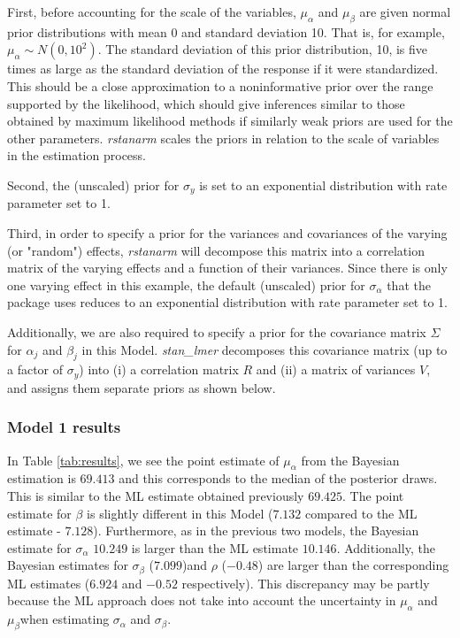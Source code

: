 First, before accounting for the scale of the variables, $\mu_{\alpha}$ and $\mu_{\beta}$ are given normal prior distributions with mean 0 and standard deviation 10.  That is, for example, $\mu_{\alpha} \sim N(0, 10^2)$. The standard deviation of this prior distribution, 10, is five times as large as the standard deviation of the response if it were standardized. This should be a close approximation to a noninformative prior over the range supported by the likelihood, which should give inferences similar to those obtained by maximum likelihood methods if similarly weak priors are used for the other parameters. \textit{rstanarm} scales the priors in relation to the scale of variables in the estimation process.

Second, the (unscaled) prior for $\sigma_{y}$ is set to an exponential distribution with rate parameter set to 1.

Third, in order to specify a prior for the variances and covariances of the varying (or "random") effects, \textit{rstanarm} will decompose this matrix into a correlation matrix of the varying effects and a function of their variances.  Since there is only one varying effect in this example, the default (unscaled) prior for $\sigma_{\alpha}$ that the package uses reduces to an exponential distribution with rate parameter set to 1.

Additionally, we are also required to specify a prior for the covariance matrix $\Sigma$ for $\alpha_j$ and $\beta_j$ in this Model.  \textit{stan\_lmer} decomposes this covariance matrix (up to a factor of $\sigma_y$) into (i) a correlation matrix $R$ and (ii) a matrix of variances $V$, and assigns them separate priors as shown below.

\subsubsection*{Model 1 results}
In Table \ref{tab:results}, we see the point estimate of $\mu_{\alpha}$ from the Bayesian estimation is $69.413$ and this corresponds to the median of the posterior draws.  This is similar to the ML estimate obtained previously $69.425$.  The point estimate for $\beta$ is slightly different in this Model ($7.132$ compared to the ML estimate -  $7.128$).  Furthermore, as in the previous two models, the Bayesian estimate for $\sigma_{\alpha}$ $10.249$ is larger than the ML estimate $10.146$. Additionally, the Bayesian estimates for $\sigma_{\beta}$ ($7.099$)and $\rho$ ($-0.48$) are larger than the corresponding ML estimates ($6.924$ and $-0.52$ respectively). This discrepancy may be partly because the ML approach does not take into account the uncertainty in $\mu_{\alpha}$ and $\mu_{\beta}$when estimating $\sigma_{\alpha}$ and $\sigma_{\beta}$.

